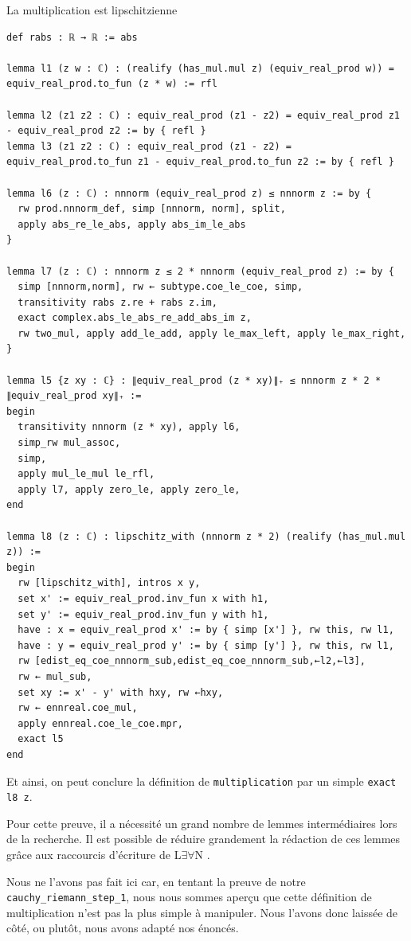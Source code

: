 \documentclass[a4paper, 11pt, twoside]{report}
\newcommand{\LEAN}{L$\exists\forall$N }
\begin{document}
\begin{code}{La multiplication est lipschitzienne}
\begin{lstlisting}
def rabs : ℝ → ℝ := abs

lemma l1 (z w : ℂ) : (realify (has_mul.mul z) (equiv_real_prod w)) = equiv_real_prod.to_fun (z * w) := rfl

lemma l2 (z1 z2 : ℂ) : equiv_real_prod (z1 - z2) = equiv_real_prod z1 - equiv_real_prod z2 := by { refl }
lemma l3 (z1 z2 : ℂ) : equiv_real_prod (z1 - z2) = equiv_real_prod.to_fun z1 - equiv_real_prod.to_fun z2 := by { refl }

lemma l6 (z : ℂ) : nnnorm (equiv_real_prod z) ≤ nnnorm z := by {
  rw prod.nnnorm_def, simp [nnnorm, norm], split,
  apply abs_re_le_abs, apply abs_im_le_abs
}

lemma l7 (z : ℂ) : nnnorm z ≤ 2 * nnnorm (equiv_real_prod z) := by {
  simp [nnnorm,norm], rw ← subtype.coe_le_coe, simp,
  transitivity rabs z.re + rabs z.im,
  exact complex.abs_le_abs_re_add_abs_im z,
  rw two_mul, apply add_le_add, apply le_max_left, apply le_max_right,
}

lemma l5 {z xy : ℂ} : ∥equiv_real_prod (z * xy)∥₊ ≤ nnnorm z * 2 * ∥equiv_real_prod xy∥₊ :=
begin
  transitivity nnnorm (z * xy), apply l6,
  simp_rw mul_assoc,
  simp,
  apply mul_le_mul le_rfl,
  apply l7, apply zero_le, apply zero_le,
end

lemma l8 (z : ℂ) : lipschitz_with (nnnorm z * 2) (realify (has_mul.mul z)) :=
begin
  rw [lipschitz_with], intros x y,
  set x' := equiv_real_prod.inv_fun x with h1,
  set y' := equiv_real_prod.inv_fun y with h1,
  have : x = equiv_real_prod x' := by { simp [x'] }, rw this, rw l1,
  have : y = equiv_real_prod y' := by { simp [y'] }, rw this, rw l1,
  rw [edist_eq_coe_nnnorm_sub,edist_eq_coe_nnnorm_sub,←l2,←l3],
  rw ← mul_sub,
  set xy := x' - y' with hxy, rw ←hxy,
  rw ← ennreal.coe_mul,
  apply ennreal.coe_le_coe.mpr,
  exact l5
end
\end{lstlisting}
\end{code}
	
Et ainsi, on peut conclure la définition de \verb|multiplication| par un simple \verb|exact l8 z|.
	
Pour cette preuve, il a nécessité un grand nombre de lemmes intermédiaires lors de la recherche. Il est possible de réduire grandement la rédaction de ces lemmes grâce aux raccourcis d'écriture de \LEAN.

Nous ne l'avons pas fait ici car, en tentant la preuve de notre \verb|cauchy_riemann_step_1|, nous nous sommes aperçu que cette définition de multiplication n'est pas la plus simple à manipuler. Nous l'avons donc laissée de côté, ou plutôt, nous avons adapté nos énoncés.
\end{document}
